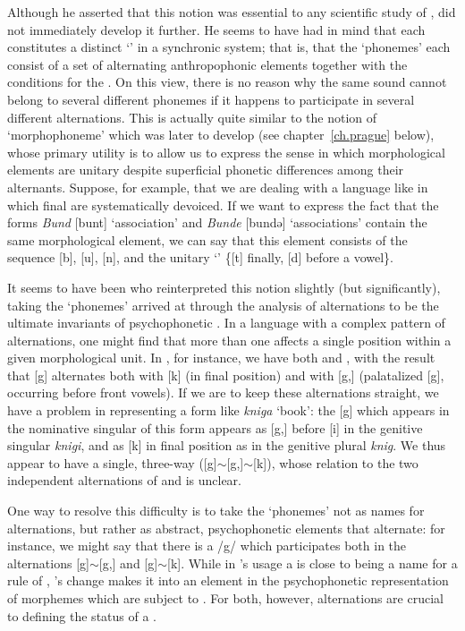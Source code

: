 Although he asserted that this notion was essential to any scientific
study of , {\Kruszewski} did not immediately
develop it further. He seems to have had in mind that each 
constitutes a distinct `' in a synchronic system; that is, that
the `phonemes' each consist of a set of alternating anthropophonic
elements together with the conditions for the . On this
view, there is no reason why the same sound cannot belong to several
different phonemes if it happens to participate in several different
alternations. This is actually quite similar to the notion of
`morphophoneme' which {\Trubetzkoy} was later to develop (see
chapter~\ref{ch.prague} below), whose primary utility is to allow us
to express the sense in which morphological elements are unitary
despite superficial phonetic differences among their
alternants. Suppose, for example, that we are dealing with a language
like  in which final  are systematically devoiced. If
we want to express the fact that the forms \emph{Bund} {[bunt]}
`association' and \emph{Bunde} {[bundə]} `associations' contain the
same morphological element, we can say that this element consists of
the sequence {[b]}, {[u]}, {[n]}, and the unitary `' \{{[t]}
finally, {[d]} before a vowel\}.

It seems to have been {\Baudouin} who reinterpreted this notion slightly
(but significantly), taking the `phonemes' arrived at through the
analysis of alternations to be the ultimate invariants of
psychophonetic . In a language with a complex pattern
of alternations, one might find that more than one  affects
a single position within a given morphological unit. In , for
instance, we have both  and , with the
result that [g] alternates both with [k] (in final position) and with
[g,] (palatalized [g], occurring before front vowels). If we are to
keep these alternations straight, we have a problem in representing a
form like \emph{kniga} `book': the [g] which appears in the nominative
singular of this form appears as [g,] before [i] in the genitive
singular \emph{knigi}, and as [k] in final position as in the genitive
plural \emph{knig}. We thus appear to have a single, three-way
 ({[g]$\sim$[g,]$\sim$[k]}), whose relation to the two independent
alternations of  and  is unclear.

One way to resolve this difficulty is to take the `phonemes' not as
names for alternations, but rather as abstract, psychophonetic
elements that alternate: for instance, we might say that there is a
 /g/ which participates both in the alternations
{[g]$\sim$[g,]} and {[g]$\sim$[k]}. While in {\Kruszewski}'s usage a
 is close to being a name for a rule of , {\Baudouin}'s
change makes it into an element in the psychophonetic representation
of morphemes which are subject to . For both, however,
alternations are crucial to defining the status of a .


